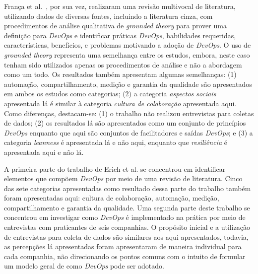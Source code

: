Fran\c{c}a et al.~\cite{characterizing_devops}, por sua vez, realizaram uma
revisão multivocal de literatura, utilizando dados de diversas fontes, incluindo
a literatura cinza, com procedimentos de análise qualitativa de {\it grounded
theory} para prover uma definição para {\it DevOps} e identificar práticas
{\it DevOps}, habilidades requeridas, características, benefícios, e problemas
motivando a adoção de {\it DevOps}. O uso de {\it grounded theory} representa
uma semelhança entre os estudos, embora, neste caso tenham sido utilizados
apenas os procedimentos de análise e não a abordagem como um todo. Os resultados
também apresentam algumas semelhanças: (1) automação, compartilhamento, medição
e garantia da qualidade são apresentados em ambos os estudos como categorias;
(2) a categoria \emph{aspectos sociais} apresentada lá é similar à categoria
\emph{cultura de colaboração} apresentada aqui. Como diferenças, destacam-se:
(1) o trabalho não realizou entrevistas para coletas de dados; (2) os
resultados lá são apresentados como um conjunto de princípios {\it DevOps}
enquanto que aqui são conjuntos de facilitadores e saídas {\it DevOps}; e (3)
a categoria {\it leanness} é apresentada lá e não aqui, enquanto que
\emph{resiliência} é apresentada aqui e não lá.

A primeira parte do trabalho de Erich et al. \cite{qualitative_devops_journalsw_17}
se concentrou em identificar elementos que compõem {\it DevOps} por meio de uma
revisão de literatura. Cinco das sete categorias apresentadas como resultado
dessa parte do trabalho também foram apresentadas aqui: cultura de colaboração,
automação, medição, compartilhamento e garantia da qualidade. Uma segunda parte
deste trabalho se concentrou em investigar como {\it DevOps} é implementado na
prática por meio de entrevistas com praticantes de seis companhias. O propósito
inicial e a utilização de entrevistas para coleta de dados são similares aos
aqui apresentados, todavia, as percepções lá apresentadas foram apresentaram de
maneira individual para cada companhia, não direcionando os pontos comuns com o
intuito de formular um modelo geral de como {\it DevOps} pode ser adotado.

